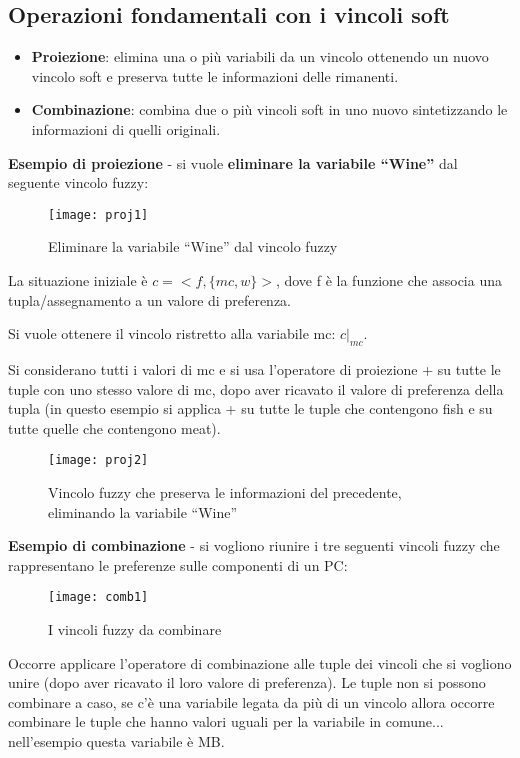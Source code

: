 \subsection{Operazioni fondamentali con i vincoli soft}

\begin{itemize}
 \item \textbf{Proiezione}: elimina una o più variabili da un vincolo
ottenendo un nuovo vincolo soft e preserva tutte le informazioni delle
rimanenti.
 \item \textbf{Combinazione}: combina due o più vincoli soft in uno
nuovo sintetizzando le informazioni di quelli originali.
\end{itemize}

\textbf{Esempio di proiezione} - si vuole \textbf{eliminare la variabile
``Wine''} dal seguente vincolo fuzzy:

\begin{figure}[H]
\centering
\texttt{[image: proj1]}
\caption{Eliminare la variabile ``Wine'' dal vincolo fuzzy}
\label{fig:proj1}
\end{figure}

La situazione iniziale è $c=<f,\{mc,w\}>$, dove f è la funzione che
associa una tupla/assegnamento a un valore di preferenza.

Si vuole ottenere il vincolo ristretto alla variabile mc: $c|_{mc}$.

Si considerano tutti i valori di mc e si usa l'operatore di proiezione +
su tutte le tuple con uno stesso valore di mc, dopo aver ricavato
il valore di preferenza della tupla (in questo esempio si applica + su
tutte le tuple che contengono fish e su tutte quelle che contengono meat).

\begin{figure}[H]
\centering
\texttt{[image: proj2]}
\caption{Vincolo fuzzy che preserva le informazioni del precedente, eliminando
la variabile ``Wine''}
\label{fig:proj2}
\end{figure}

\textbf{Esempio di combinazione} - si vogliono riunire i tre seguenti vincoli
fuzzy che rappresentano le preferenze sulle componenti di un PC:

\begin{figure}[H]
\centering
\texttt{[image: comb1]}
\caption{I vincoli fuzzy da combinare}
\label{fig:comb1}
\end{figure}

Occorre applicare l'operatore di combinazione alle tuple dei vincoli
che si vogliono unire (dopo aver ricavato il loro valore di preferenza).
Le tuple non si possono combinare a caso, se c'è una variabile legata
da più di un vincolo allora occorre combinare le tuple che hanno valori
uguali per la variabile in comune... nell'esempio questa variabile è MB.

